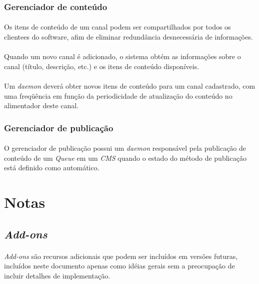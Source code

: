 \documentclass[a4paper,12pt]{article}
\def\cms{\emph{CMS}}
\def\queue{\emph{Queue}}
\begin{document}
\subsubsection{Gerenciador de conteúdo} \label{gerenciadorconteudo}

\paragraph{}
Os itens de conteúdo de um canal podem ser compartilhados por todos os
clientees do software, afim de eliminar redundância desnecessária de
informações.

\paragraph{}
Quando um novo canal é adicionado, o sistema obtém as informações sobre o canal
(título, descrição, etc.) e os itens de conteúdo disponíveis.

\paragraph{}
Um \emph{daemon} deverá obter novos itens de conteúdo para um canal cadastrado,
com uma freqüência em função da periodicidade de atualização do conteúdo no
alimentador deste canal.

\subsubsection{Gerenciador de publicação} \label{gerenciadorpublicacao}

\paragraph{}
O gerenciador de publicação possui um \emph{daemon} responsável pela publicação
de conteúdo de um \queue{} em um \cms{} quando o estado do método de publicação
está definido como automático. 

\appendix

\section{Notas}

\subsection{\emph{Add-ons}}

\paragraph{}
\emph{Add-ons} são recursos adicionais que podem ser incluídos em versões
futuras, incluídos neste documento apenas como idéias gerais sem a preocupação
de incluir detalhes de implementação.
\end{document}
